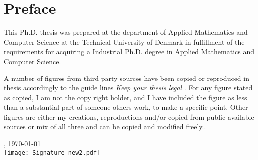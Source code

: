 \chapter{Preface}
This Ph.D. thesis was prepared at the department of Applied Mathematics and Computer Science at the Technical University of Denmark in fulfillment of the requirements for acquiring a Industrial Ph.D. degree in Applied Mathematics and Computer Science.

A number of figures from third party sources have been copied or reproduced in thesis accordingly to the guide lines \textit{Keep your thesis legal} \cite{johnson2015keeping}. For any figure stated as copied, I am not the copy right holder, and I have included the figure as less than a substantial part of someone others work, to make a specific point. Other figures are either my creations, reproductions and/or copied from public available sources or mix of all three and can be copied and modified freely..

\vfill

{
\centering
    \thesislocation{}, \today\\[1cm]
    \hspace{3cm}\texttt{[image: Signature\_new2.pdf]}\\[1cm]
\begin{flushright}
    \thesisauthor{}
\end{flushright}
}